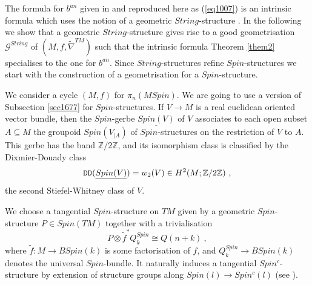 \documentclass[12pt]{article}
\newcommand{\DD}{{\tt DD}}
\newcommand{\cG}{{\mathcal{G}}}
\newcommand{\Z}{{\mathbb{Z}}}
\begin{document}
 
 \bigskip
 
 The formula for $b^{an}$ given in  \cite[Sec 3.3]{2009arXiv0912.4875B} and reproduced here as (\ref{eq1007}) is an intrinsic formula which uses the notion of a geometric $String$-structure \cite{2009arXiv0906.0117W}. In the following we show that a geometric $String$-structure gives rise to a good geometrisation $\cG^{String}$ of $(M,f,\tilde \nabla^{TM})$ such that the intrinsic formula  Theorem \ref{them2}  specialises to the one for $b^{an}$.
 Since $String$-structures refine $Spin$-structures we start with the construction of a geometrisation for a $Spin$-structure.
 
We consider a cycle $(M,f)$ for $\pi_{n}(MSpin)$. 
 We are going to use a version of Subsection \ref{sec1677} for $Spin$-structures. If $V\to M$ is a real euclidean oriented vector bundle, then  the $Spin$-gerbe  $\underline{Spin(V)}$ of $V$ associates to each open subset $A\subseteq M$ the groupoid $Spin(V_{|A})$ of $Spin$-structures on the restriction of $V$ to $A$. This gerbe has the band
$\Z/2\Z$, and its isomorphism class is  classified by the Dixmier-Douady class 
$$\DD(\underline{Spin(V)})=w_{2}(V)\in H^{2}(M;\Z/2\Z)\ ,$$
the second Stiefel-Whitney class of $V$.

We choose a tangential $Spin$-structure on $TM$  given by a geometric $Spin$-structure
$P\in Spin(TM)$ together with a trivialisation 
\begin{equation}\label{eq65789}P\otimes \tilde f^{*}Q^{Spin}_{k}\cong Q(n+k)\ ,\end{equation}
where $\tilde f:M\to BSpin(k)$ is some factorisation of $f$, and $Q^{Spin}_{k}\to BSpin(k)$   denotes
the universal $Spin$-bundle.  It naturally induces a tangential $Spin^{c}$-structure by extension of structure groups along $Spin(l)\to Spin^{c}(l)$ (see \cite[Example D.5]{MR1031992}).
\end{document}
